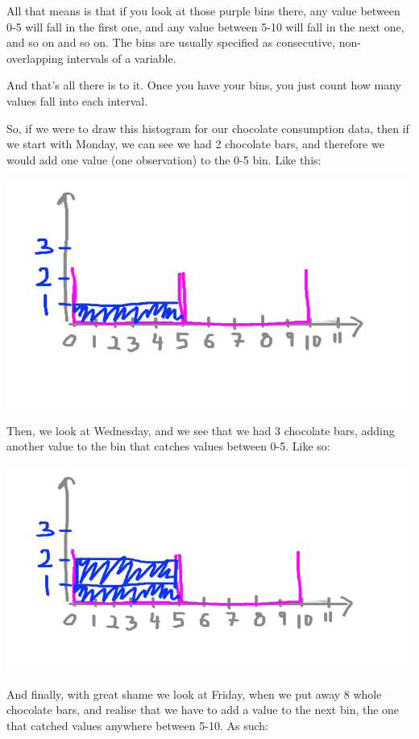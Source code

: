 \documentclass[
]{book}
\begin{document}
All that means is that if you look at those purple bins there, any value between 0-5 will fall in the first one, and any value between 5-10 will fall in the next one, and so on and so on. The bins are usually specified as consecutive, non-overlapping intervals of a variable.

And that's all there is to it. Once you have your bins, you just count how many values fall into each interval.

So, if we were to draw this histogram for our chocolate consumption data, then if we start with Monday, we can see we had 2 chocolate bars, and therefore we would add one value (one observation) to the 0-5 bin. Like this:

\includegraphics{imgs/hist_fill_1.png}

Then, we look at Wednesday, and we see that we had 3 chocolate bars, adding another value to the bin that catches values between 0-5. Like so:

\includegraphics{imgs/hist_fill_2.png}

And finally, with great shame we look at Friday, when we put away 8 whole chocolate bars, and realise that we have to add a value to the next bin, the one that catched values anywhere between 5-10. As such:
\end{document}
